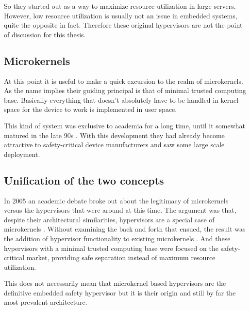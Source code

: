 So they started out as a way to maximize resource utilization in large servers. However, low resource utilization is usually not an issue in embedded systems, quite the opposite in fact. Therefore these original hypervisors are not the point of discussion for this thesis.
\subsection{Microkernels}
At this point it is useful to make a quick excursion to the realm of microkernels. As the name implies their guiding principal is that of minimal trusted computing base. Basically everything that doesn't absolutely have to be handled in kernel space for the device to work is implemented in user space.

This kind of system was exclusive to academia for a long time, until it somewhat matured in the late 90s \cite{Liedtke.1995}\cite{Liedtke.1996}. With this development they had already become attractive to safety-critical device manufacturers and saw some large scale deployment.

\subsection{Unification of the two concepts}
In 2005 an academic debate broke out about the legitimacy of microkernels versus the hypervisors that were around at this time. 
The argument was that, despite their architectural similarities, hypervisors are a special case of microkernels  \cite{StevenHand.2005}\cite{Heiser.2006}. Without examining the back and forth that ensued, the result was the addition of hypervisor functionality to existing microkernels \cite{Heiser.2010}. And these hypervisors with a minimal trusted computing base were focused on the safety-critical market, providing safe separation instead of maximum resource utilization.

This does not necessarily mean that microkernel based hypervisors are the definitive embedded safety hypervisor but it is their origin and still by far the most prevalent architecture.


